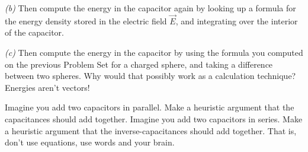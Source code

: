 \documentclass[12pt]{article}
\begin{document}
\textsl{(b)}
Then compute the energy in the capacitor again by looking up a formula
for the energy density stored in the electric field $\vec{E}$, and
integrating over the interior of the capacitor.

\textsl{(c)}
Then compute the energy in the capacitor by using the formula you
computed on the previous Problem Set for a charged sphere, and taking
a difference between two spheres.  Why would that possibly work as a
calculation technique? Energies aren't vectors!

\startproblem
Imagine you add two capacitors in parallel. Make a heuristic argument
that the capacitances should add together. Imagine you add two capacitors
in series. Make a heuristic argument that the inverse-capacitances should
add together. That is, don't use equations, use words and your brain.
\end{document}
